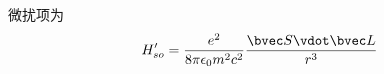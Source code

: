 
\begin{issues}
\issueDraft
\end{issues}

微扰项为
\begin{equation}
H'_{so} = \frac{e^2}{8\pi \epsilon_0 m^2 c^2} \frac{\bvec S \vdot \bvec L}{r^3}
\end{equation}
